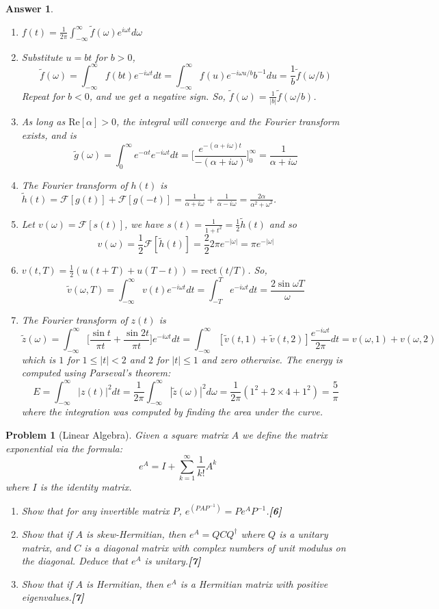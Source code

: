 \documentclass[a4paper]{article}
\newtheorem{ans}{Answer}[section]
\theoremstyle{new}
\newtheorem{qns}{Problem}[section]
\begin{document}
\begin{ans}\leavevmode
\begin{enumerate}[label=(\alph*)]
\item $f(t)=\frac{1}{2\pi}\int_{-\infty}^\infty\tilde{f}(\omega)e^{i\omega t}d\omega$
\item Substitute $u=bt$ for $b>0$,
$$\tilde{f}(\omega)=\int_{-\infty}^\infty f(bt)e^{-i\omega t}dt=\int_{-\infty}^\infty f(u)e^{-i\omega u/b}b^{-1}du=\frac{1}{b}\tilde{f}(\omega/b)$$
Repeat for $b<0$, and we get a negative sign. So, $\tilde{f}(\omega)=\frac{1}{|b|}\tilde{f}(\omega/b)$.
\item As long as $\text{Re}[\alpha]>0$, the integral will converge and the Fourier transform exists, and is
$$\tilde{g}(\omega)=\int_0^\infty e^{-\alpha t}e^{-i\omega t}dt=\bigg[\frac{e^{-(\alpha+i\omega)t}}{-(\alpha+i\omega)}\bigg]_0^\infty=\frac{1}{\alpha+i\omega}$$
\item The Fourier transform of $h(t)$ is
$\tilde{h}(t)=\mathcal{F}[g(t)]+\mathcal{F}[g(-t)]=\frac{1}{\alpha+i\omega}+\frac{1}{\alpha-i\omega}=\frac{2\alpha}{\alpha^2+\omega^2}$. 
\item Let $v(\omega)=\mathcal{F}[s(t)]$, we have $s(t)=\frac{1}{1+t^2}=\frac{1}{2}\tilde{h}(t)$ and so $$v(\omega)=\frac{1}{2}\mathcal{F}[\tilde{h}(t)]=\frac{2}{2}2\pi e^{-|\omega|}=\pi e^{-|\omega|}$$
\item $v(t,T)=\frac{1}{2}(u(t+T)+u(T-t))=\text{rect}(t/T)$. So,
$$\tilde{v}(\omega,T)=\int_{-\infty}^\infty v(t)e^{-i\omega t}dt=\int_{-T}^Te^{-i\omega t}dt=\frac{2\sin\omega T}{\omega}$$
\item The Fourier transform of $z(t)$ is
$$\tilde{z}(\omega)=\int_{-\infty}^\infty\bigg[\frac{\sin t}{\pi t}+\frac{\sin 2t}{\pi t}\bigg]e^{-i\omega t}dt=\int_{-\infty}^\infty[\tilde{v}(t,1)+\tilde{v}(t,2)]\frac{e^{-i\omega t}}{2\pi}dt=v(\omega,1)+v(\omega,2)$$
which is $1$ for $1\leq|t|<2$ and $2$ for $|t|\leq1$ and zero otherwise. The energy is computed using Parseval's theorem:
$$E=\int_{-\infty}^\infty|z(t)|^2dt=\frac{1}{2\pi}\int_{-\infty}^\infty|\tilde{z}(\omega)|^2d\omega=\frac{1}{2\pi}(1^2+2\times 4+1^2)=\frac{5}{\pi}$$
where the integration was computed by finding the area under the curve.
\end{enumerate}
\end{ans}
\newpage
\begin{qns}[Linear Algebra]
Given a square matrix $A$ we define the matrix exponential via the formula:
$$e^A=I+\sum_{k=1}^\infty\frac{1}{k!}A^k$$
where $I$ is the identity matrix.
\begin{enumerate}[label=(\alph*)]
\item Show that for any invertible matrix $P$, $e^{(PAP^{−1})} = Pe^AP^{−1}$.\hfill\textbf{[6]}
\item Show that if $A$ is skew-Hermitian, then $e^A=QCQ^\dag$ where $Q$ is a unitary matrix, and $C$ is a diagonal matrix with complex numbers of unit modulus on the diagonal. Deduce that $e^A$ is unitary.\hfill\textbf{[7]}
\item Show that if $A$ is Hermitian, then $e^A$ is a Hermitian matrix with positive eigenvalues.\hfill\textbf{[7]}
\end{enumerate}
\end{qns}
\end{document}
